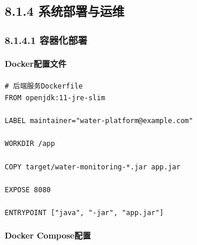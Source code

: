 \subsection{8.1.4
系统部署与运维}\label{ux7cfbux7edfux90e8ux7f72ux4e0eux8fd0ux7ef4}

\subsubsection{8.1.4.1 容器化部署}\label{ux5bb9ux5668ux5316ux90e8ux7f72}

\paragraph{Docker配置文件}\label{dockerux914dux7f6eux6587ux4ef6}

\begin{lstlisting}
# 后端服务Dockerfile
FROM openjdk:11-jre-slim

LABEL maintainer="water-platform@example.com"

WORKDIR /app

COPY target/water-monitoring-*.jar app.jar

EXPOSE 8080

ENTRYPOINT ["java", "-jar", "app.jar"]
\end{lstlisting}

\paragraph{Docker Compose配置}\label{docker-composeux914dux7f6e}

